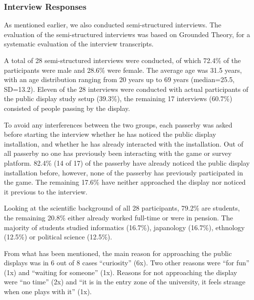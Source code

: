 









	\subsubsection{Interview Responses}

	As mentioned earlier, we also conducted semi-structured interviews. The evaluation of the semi-structured interviews was based on Grounded Theory, for a systematic evaluation of the interview transcripts.

	A total of 28 semi-structured interviews were conducted, of which 72.4\% of the participants were male and 28.6\% were female. The average age was 31.5 years, with an age distribution ranging from 20 years up to 69 years (median=25.5, SD=13.2). Eleven of the 28 interviews were conducted with actual participants of the public display study setup (39.3\%), the remaining 17 interviews (60.7\%) consisted of people passing by the display. 

	To avoid any interferences between the two groups, each passerby was asked before starting the interview whether he has noticed the public display installation, and whether he has already interacted with the installation. Out of all passerby no one has previously been interacting with the game or survey platform. 82.4\% (14 of 17) of the passerby have already noticed the public display installation before, however, none of the passerby has previously participated in the game. The remaining 17.6\% have neither approached the display nor noticed it previous to the interview. 

	Looking at the scientific background of all 28 participants, 79.2\% are students, the remaining 20.8\% either already worked full-time or were in pension. The majority of students studied informatics (16.7\%), japanology (16.7\%), ethnology (12.5\%) or political science (12.5\%).

	From what has been mentioned, the main reason for approaching the public displays was in 6 out of 8 cases ``curiosity'' (6x). Two other reasons were ``for fun'' (1x) and ``waiting for someone'' (1x). Reasons for not approaching the display were ``no time'' (2x) and ``it is in the entry zone of the university, it feels strange when one plays with it'' (1x).




